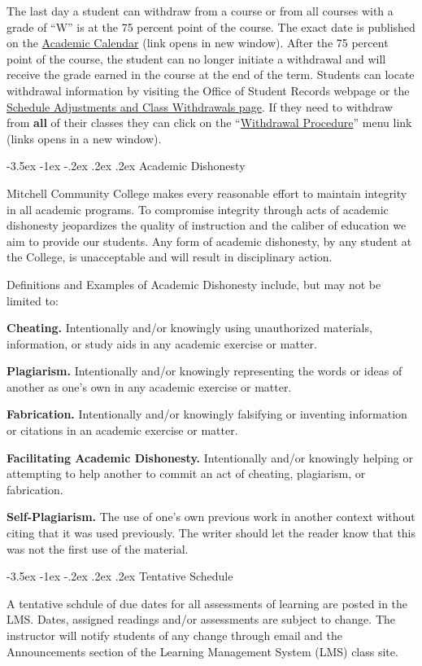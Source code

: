 \documentclass{article}
\makeatletter
\renewcommand\section{\@startsection{section}{1}{0pt}%
  {-3.5ex \@plus -1ex \@minus -.2ex}%
  {.2ex \@plus.2ex}%
  {\normalfont\Large\bfseries}} %
\makeatother
\begin{document}
The last day a student can withdraw from a course or from all courses with a grade of ``W'' is at the 75 percent point of the course. The exact date is published on the \href{https://www.mitchellcc.edu/wp-content/uploads/2024/05/2024-2025-Academic-Calendar.pdf}{Academic Calendar} (link opens in new window). After the 75 percent point of the course, the student can no longer initiate a withdrawal and will receive the grade earned in the course at the end of the term. Students can locate withdrawal information by visiting the Office of Student Records webpage or the \href{https://www.mitchellcc.edu/schedule-adjustments-and-class-withdrawals/}{Schedule Adjustments and Class Withdrawals page}. If they need to withdraw from \textbf{all} of their classes they can click on the ``\href{https://mitchellcc.edu/withdrawal-procedure}{Withdrawal Procedure}'' menu link (links opens in a new window).

\section{Academic Dishonesty}

Mitchell Community College makes every reasonable effort to maintain integrity in all academic programs. To compromise integrity through acts of academic dishonesty jeopardizes the quality of instruction and the caliber of education we aim to provide our students.  Any form of academic dishonesty, by any student at the College, is unacceptable and will result in disciplinary action.

Definitions and Examples of Academic Dishonesty include, but may not be limited to:

\textbf{Cheating.} Intentionally and/or knowingly using unauthorized materials, information, or study aids in any academic exercise or matter.

\textbf{Plagiarism.} Intentionally and/or knowingly representing the words or ideas of another as one's own in any academic exercise or matter.

\textbf{Fabrication.} Intentionally and/or knowingly falsifying or inventing information or citations in an academic exercise or matter.

\textbf{Facilitating Academic Dishonesty.} Intentionally and/or knowingly helping or attempting to help another to commit an act of cheating, plagiarism, or fabrication.

\textbf{Self-Plagiarism.} The use of one's own previous work in another context without citing that it was used previously. The writer should let the reader know that this was not the first use of the material.

\section{Tentative Schedule}

A tentative schdule of due dates for all assessments of learning are posted in the LMS. Dates, assigned readings and/or assessments are subject to change. The instructor will notify students of any change through email and the Announcements section of the Learning Management System (LMS) class site.
\end{document}
